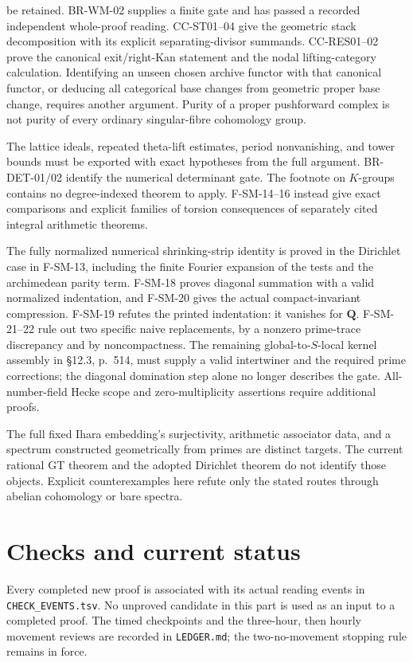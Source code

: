 \documentclass[11pt,a4paper]{article}
\theoremstyle{definition}\newtheorem{definition}[theorem]{Definition}
\theoremstyle{remark}\newtheorem{remark}[theorem]{Remark}
\begin{document}
\begin{description}[style=nextline,leftmargin=0pt,labelwidth=0pt,labelsep=0pt]
be retained. BR-WM-02 supplies a finite gate and has passed a
recorded independent whole-proof reading. CC-ST01--04 give the geometric
stack decomposition with its explicit separating-divisor summands.
CC-RES01--02 prove the canonical exit/right-Kan statement and the nodal
lifting-category calculation. Identifying an unseen chosen archive
functor with that canonical functor, or deducing all categorical base
changes from geometric proper base change, requires another argument.
Purity of a proper pushforward
complex is not purity of every ordinary singular-fibre cohomology group.
\item[The analytic method as a transferable theorem.]
The lattice ideals, repeated theta-lift estimates, period nonvanishing,
and tower bounds must be exported with exact hypotheses from the
full argument. BR-DET-01/02 identify the numerical determinant gate.
The footnote on $K$-groups contains no degree-indexed theorem to apply.
F-SM-14--16 instead give exact comparisons and explicit families of
torsion consequences of separately cited integral arithmetic theorems.
\item[Masullo's operator realization.]
The fully normalized numerical shrinking-strip identity is proved in
the Dirichlet case in F-SM-13, including the finite Fourier expansion
of the tests and the archimedean parity term. F-SM-18 proves diagonal summation with a valid normalized indentation,
and F-SM-20 gives the actual compact-invariant compression. F-SM-19
refutes the printed indentation: it vanishes for $\mathbf Q$.
F-SM-21--22 rule out two specific naive replacements, by a nonzero
prime-trace discrepancy and by noncompactness. The remaining
global-to-$S$-local kernel assembly in \S12.3, p.~514, must supply
a valid intertwiner and the required prime corrections; the
diagonal domination step alone no longer describes the gate. All-number-field Hecke scope and
zero-multiplicity assertions require additional proofs.
\item[Profinite GT, anabelian reconstruction and geometric spectra.]
The full fixed Ihara embedding's surjectivity, arithmetic associator
data, and a spectrum constructed geometrically from primes are distinct
targets. The current rational GT theorem and the adopted Dirichlet
theorem do not identify those objects. Explicit counterexamples here
refute only the stated routes through abelian cohomology or bare spectra.
\end{description}

\section{Checks and current status}
Every completed new proof is associated with its actual reading events
in \nolinkurl{CHECK_EVENTS.tsv}. No unproved candidate in this part is
used as an input to a completed proof. The timed checkpoints and the
three-hour, then hourly movement reviews are recorded in
\nolinkurl{LEDGER.md}; the two-no-movement stopping rule remains in force.
\clearpage
\end{document}
